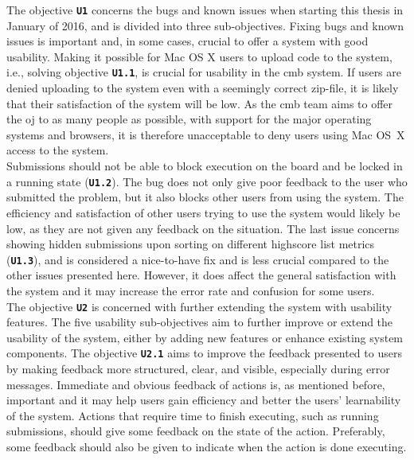 The objective \textbf{\texttt{U1}} concerns the bugs and known issues when starting this thesis in January of 2016, and is divided into three sub-objectives. Fixing bugs and known issues is important and, in some cases, crucial to offer a system with good usability. Making it possible for Mac OS X users to upload code to the system, i.e., solving objective \textbf{\texttt{U1.1}}, is crucial for usability in the \gls{cmb} system. If users are denied uploading to the system even with a seemingly correct zip-file, it is likely that their satisfaction of the system will be low. As the \gls{cmb} team aims to offer the \gls{oj} to as many people as possible, with support for the major operating systems and browsers, it is therefore unacceptable to deny users using Mac OS~X access to the system. \\

Submissions should not be able to block execution on the board and be locked in a running state (\textbf{\texttt{U1.2}}). The bug does not only give poor feedback to the user who submitted the problem, but it also blocks other users from using the system. The efficiency and satisfaction of other users trying to use the system would likely be low, as they are not given any feedback on the situation. The last issue concerns showing hidden submissions upon sorting on different highscore list metrics (\textbf{\texttt{U1.3}}), and is considered a nice-to-have fix and is less crucial compared to the other issues presented here. However, it does affect the general satisfaction with the system and it may increase the error rate and confusion for some users. \\

The objective \textbf{\texttt{U2}} is concerned with further extending the system with usability features. The five usability sub-objectives aim to further improve or extend the usability of the system, either by adding new features or enhance existing system components. The objective \textbf{\texttt{U2.1}} aims to improve the feedback presented to users by making feedback more structured, clear, and visible, especially during error messages. Immediate and obvious feedback of actions is, as mentioned before, important and it may help users gain efficiency and better the users' learnability of the system. Actions that require time to finish executing, such as running submissions, should give some feedback on the state of the action. Preferably, some feedback should also be given to indicate when the action is done executing. \\

